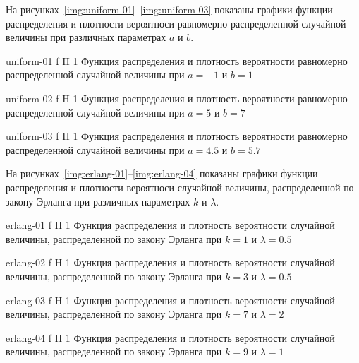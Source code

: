 \documentclass{bmstu}
\begin{document}
На рисунках~\ref{img:uniform-01}--\ref{img:uniform-03} показаны графики функции распределения и плотности вероятноси равномерно распределенной случайной величины при различных параметрах $a$ и $b$.

    {uniform-01}
    {f}
    {H}
    {1\textwidth}
    {Функция распределения и плотность вероятности равномерно распределенной случайной величины при $a = -1$ и $b = 1$}
    
    {uniform-02}
    {f}
    {H}
    {1\textwidth}
    {Функция распределения и плотность вероятности равномерно распределенной случайной величины при $a = 5$ и $b = 7$}
    
    {uniform-03}
    {f}
    {H}
    {1\textwidth}
    {Функция распределения и плотность вероятности равномерно распределенной случайной величины при $a = 4.5$ и $b = 5.7$}
    
На рисунках~\ref{img:erlang-01}--\ref{img:erlang-04} показаны графики функции распределения и плотности вероятноси случайной величины, распределенной по закону Эрланга при различных параметрах $k$ и $\lambda$.

    {erlang-01}
    {f}
    {H}
    {1\textwidth}
    {Функция распределения и плотность вероятности случайной величины, распределенной по закону Эрланга при $k = 1$ и $\lambda = 0.5$}
    
    {erlang-02}
    {f}
    {H}
    {1\textwidth}
    {Функция распределения и плотность вероятности случайной величины, распределенной по закону Эрланга при $k = 3$ и $\lambda = 0.5$}  
    
    {erlang-03}
    {f}
    {H}
    {1\textwidth}
    {Функция распределения и плотность вероятности случайной величины, распределенной по закону Эрланга при $k = 7$ и $\lambda = 2$}
    
    {erlang-04}
    {f}
    {H}
    {1\textwidth}
    {Функция распределения и плотность вероятности случайной величины, распределенной по закону Эрланга при $k = 9$ и $\lambda = 1$}
\end{document}
